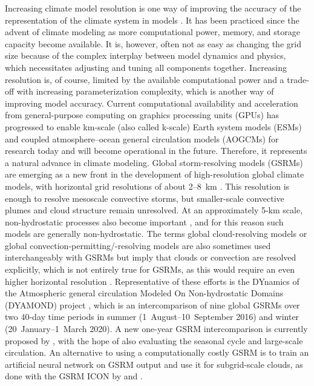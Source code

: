 \documentclass[draft]{agujournal2019}
\begin{document}
Increasing climate model resolution is one way of improving the accuracy of the representation of the climate system in models \cite{mauritsen2022}. It has been practiced since the advent of climate modeling as more computational power, memory, and storage capacity become available. It is, however, often not as easy as changing the grid size because of the complex interplay between model dynamics and physics, which necessitates adjusting and tuning all components together. Increasing resolution is, of course, limited by the available computational power and a trade-off with increasing parameterization complexity, which is another way of improving model accuracy. Current computational availability and acceleration from general-purpose computing on graphics processing units (GPUs) has progressed to enable km-scale (also called k-scale) Earth system models (ESMs) and coupled atmosphere--ocean general circulation models (AOGCMs) for research today and will become operational in the future. Therefore, it represents a natural advance in climate modeling. Global storm-resolving models (GSRMs) are emerging as a new front in the development of high-resolution global climate models, with horizontal grid resolutions of about 2--8~km \cite{satoh2019,stevens2019}. This resolution is enough to resolve mesoscale convective storms, but smaller-scale convective plumes and cloud structure remain unresolved. At an approximately 5-km scale, non-hydrostatic processes also become important \cite{weisman1997}, and for this reason such models are generally non-hydrostatic. The terms global cloud-resolving models or global convection-permitting/-resolving models are also sometimes used interchangeably with GSRMs but imply that clouds or convection are resolved explicitly, which is not entirely true for GSRMs, as this would require an even higher horizontal resolution \cite{satoh2019}. Representative of these efforts is the DYnamics of the Atmospheric general circulation Modeled On Non-hydrostatic Domains (DYAMOND) project \cite{stevens2019,dyamond}, which is an intercomparison of nine global GSRMs over two 40-day time periods in summer (1~August--10~September 2016) and winter (20~January--1~March 2020). A new one-year GSRM intercomparison is currently proposed by , with the hope of also evaluating the seasonal cycle and large-scale circulation. An alternative to using a computationally costly GSRM is to train an artificial neural network on GSRM output and use it for subgrid-scale clouds, as done with the GSRM ICON by  and .
\end{document}
